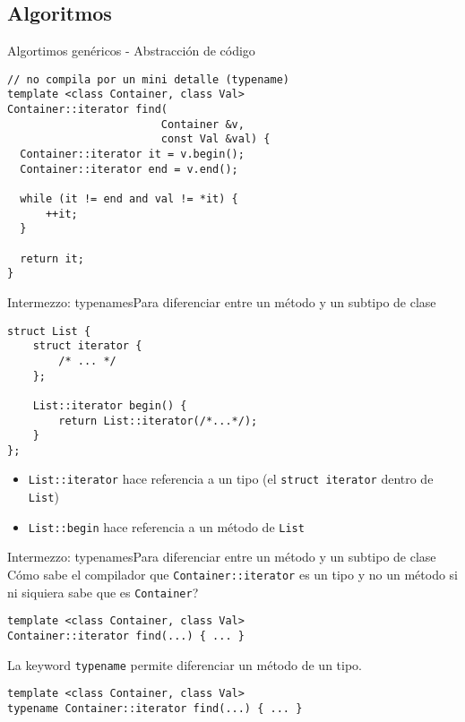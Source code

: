 \subsection{Algoritmos}
\begin{frame}[fragile]{Algortimos gen\'ericos - Abstracci\'on de c\'odigo}
      \begin{lstlisting}[style=normal]
// no compila por un mini detalle (typename)
template <class Container, class Val>
Container::iterator find(
                        Container &v, 
                        const Val &val) {
  Container::iterator it = v.begin();
  Container::iterator end = v.end();

  while (it != end and val != *it) {
      ++it;
  }

  return it;
}
      \end{lstlisting}
\end{frame}
\begin{frame}[fragile]{Intermezzo: typenames}{Para diferenciar entre un m\'etodo y un subtipo de clase}
      \begin{lstlisting}[style=normal]
struct List {
    struct iterator {
        /* ... */
    };

    List::iterator begin() {
        return List::iterator(/*...*/);
    }
};
      \end{lstlisting}
      \begin{itemize} 
          \item \lstinline[style=normal]!List::iterator! hace referencia a un tipo (el \lstinline[style=normal]!struct iterator! dentro de \lstinline[style=normal]!List!)
          \item \lstinline[style=normal]!List::begin! hace referencia a un m\'etodo de \lstinline[style=normal]!List!
      \end{itemize}
\end{frame}


\begin{frame}[fragile]{Intermezzo: typenames}{Para diferenciar entre un m\'etodo y un subtipo de clase}
C\'omo sabe el compilador que \lstinline[style=normal]!Container::iterator! es un tipo y no un m\'etodo si ni siquiera sabe que es \lstinline[style=normal]!Container!?
      \begin{lstlisting}[style=normal]
template <class Container, class Val>
Container::iterator find(...) { ... }
      \end{lstlisting}
\pause
La keyword \lstinline[style=normal]!typename! permite diferenciar un m\'etodo de un tipo.
      \begin{lstlisting}[style=normal]
template <class Container, class Val>
typename Container::iterator find(...) { ... }
      \end{lstlisting}
\end{frame}


